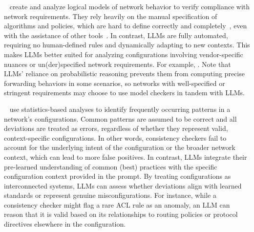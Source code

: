 ~\cite{fogel2015general, beckett2017general, abhashkumar2020tiramisu, prabhu2020plankton, zhang2022sre, steffen2020netdice, ye2020hoyan, ritchey2000using,al2011configchecker, jeffrey2009model, batfish} create and analyze logical models of network behavior to verify compliance with network requirements. They rely heavily on the manual specification of algorithms and policies, which are hard to define correctly and completely~\cite{ye2020hoyan, birkner2021metha}, even with the assistance of other tools~\cite{birkner2020config2spec, kheradmand2020anime, sharma2023prosper}. In contrast, LLMs are fully automated, requiring no human-defined rules and dynamically adapting to new contexts. This makes LLMs better suited for analyzing configurations involving vendor-specific nuances  or un(der)specified network requirements. For example, . Note that LLMs' reliance on probabilistic reasoning prevents them from computing precise forwarding behaviors in some scenarios, so networks with well-specified or stringent requirements may choose to use model checkers in tandem with LLMs.

~\cite{kakarla2024diffy,kakarla2020finding, le2006minerals, feamster2005detecting, tang2021campion, le2008detecting, le2006characterization, batfish} use statistics-based analyses to identify frequently occurring patterns in a network's  configurations. Common patterns are assumed to be correct and all deviations are treated as errors, regardless of whether they represent valid, context-specific configurations. In other words, consistency checkers fail to account for the underlying intent of the configuration or the broader network context, which can lead to more false positives. In contrast, LLMs integrate their pre-learned understanding of common (best) practices with the specific configuration context provided in the prompt. By treating configurations as interconnected systems, LLMs can assess whether deviations align with learned standards or represent genuine misconfigurations.   For instance, while a consistency checker might flag a rare ACL rule as an anomaly, an LLM can reason that it is valid based on its relationships to routing policies or protocol directives elsewhere in the configuration.

